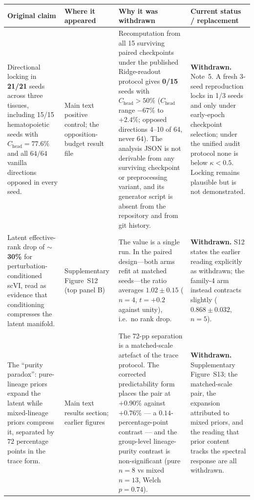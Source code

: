 \documentclass[11pt,a4paper]{article}
\begin{document}
\begin{tabular}{@{}p{} p{} p{} p{}@{}}
\toprule
\textbf{Original claim} & \textbf{Where it appeared} & \textbf{Why it was withdrawn} & \textbf{Current status / replacement} \\
\midrule

Directional locking in \textbf{21/21} seeds across three tissues, including 15/15 hematopoietic
seeds with $C_{\text{head}}=77.6\%$ and all $64/64$ vanilla directions opposed in every seed.
&
Main text positive control; the opposition-budget result file
&
Recomputation from all 15 surviving paired checkpoints under the published Ridge-readout protocol
gives \textbf{0/15} seeds with $C_{\text{head}}>50\%$ ($C_{\text{head}}$ range $-67\%$ to
$+2.4\%$; opposed directions 4--10 of 64, never 64). The analysis JSON is not derivable from any
surviving checkpoint or preprocessing variant, and its generator script is absent from the
repository and from git history.
&
\textbf{Withdrawn.} Note~5. A fresh 3-seed reproduction locks in 1/3 seeds and only under
early-epoch checkpoint selection; under the unified audit protocol none is below
$\kappa<0.5$. Locking remains plausible but is not demonstrated. \\

Latent effective-rank drop of \textbf{$\sim$30\%} for perturbation-conditioned scVI, read as
evidence that conditioning compresses the latent manifold.
&
Supplementary Figure~S12 (top panel B)
&
The value is a single run. In the paired design---both arms refit at matched seeds---the ratio
averages $1.02\pm0.15$ ($n=4$, $t=+0.2$ against unity), i.e.\ no rank drop.
&
\textbf{Withdrawn.} S12 states the earlier reading explicitly as withdrawn; the family-4 arm
instead contracts slightly ($0.868\pm0.032$, $n=5$). \\

The ``purity paradox'': pure-lineage priors expand the latent while mixed-lineage priors compress it,
separated by $72$ percentage points in the trace form.
&
Main text results section; earlier figures
&
The $72$-pp separation is a matched-scale artefact of the trace protocol. The corrected
predictability form places the pair at $+0.90\%$ against $+0.76\%$ --- a
$0.14$-percentage-point contrast --- and the group-level lineage-purity contrast is
non-significant (pure $n=8$ vs mixed $n=13$, Welch $p=0.74$).
&
\textbf{Withdrawn.} Supplementary Figure~S13; the matched-scale pair, the expansion attributed to
mixed priors, and the reading that prior content tracks the spectral response are all withdrawn. \\


\end{tabular}
\end{document}
